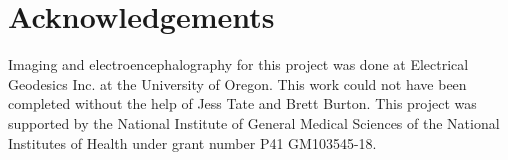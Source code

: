 %   

\section{Acknowledgements}
\label{sec:acknowl}

Imaging and electroencephalography for this project was done at Electrical Geodesics Inc. at the University of Oregon. This work could not have been completed without the help of Jess Tate and Brett Burton. This project was supported by the National Institute of General Medical Sciences of the National Institutes   of Health under grant number P41 GM103545-18. 